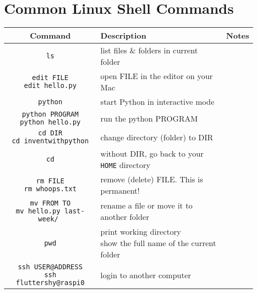 \documentclass{article}
\begin{document}

\section{Common Linux Shell Commands}

\begin{tabularx}{\textwidth}{@{} c Y Y @{}}
  Command & Description & Notes \\
  \midrule
  {\tt ls} & list files \& folders in current folder & \\
  {\tt edit FILE \\ edit hello.py} & open FILE in the editor on your Mac & \\
  {\tt python} & start Python in interactive mode & \\
  {\tt python PROGRAM \\ python hello.py} & run the python PROGRAM & \\
  {\tt cd DIR \\ cd inventwithpython} & change directory (folder) to DIR & \\
  {\tt cd} & without DIR, go back to your {\tt HOME} directory & \\
  {\tt rm FILE \\ rm whoops.txt} & remove (delete) FILE.  This is permanent! & \\
  {\tt mv FROM TO \\ mv hello.py last-week/ } & rename a file or move it to another folder & \\
  {\tt pwd} & {print working directory \\ show the full name of the current folder} & \\
  {\tt ssh USER@ADDRESS \\ ssh fluttershy@raspi0} & login to another computer & \\
\end{tabularx}
 
\end{document}
